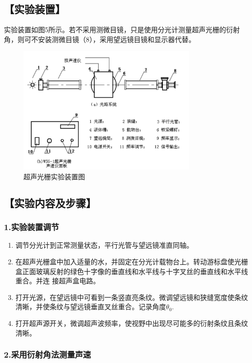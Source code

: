 \documentclass[12pt,a4paper,UTF8]{ctexart}
\begin{document}
\subsection*{【实验装置】}
实验装置如图5所示。若不采用测微目镜，只是使用分光计测量超声光栅的衍射角，则可不安装测微目镜（8），采用望远镜目镜和显示器代替。
\begin{figure}[htbp]
	\centering
	\includegraphics[width=0.8\textwidth]{img//6.jpg}
	\caption{超声光栅实验装置图}
\end{figure}


\subsection*{【实验内容及步骤】}

\subsubsection*{1.实验装置调节}
    \begin{enumerate}
		\item 调节分光计到正常测量状态，平行光管与望远镜准直同轴。
		\item 在超声光栅盒中加入适量的水，并固定在分光计载物台上。转动游标盘使光栅盒正面玻璃反射的绿色十字像的垂直线和水平线与十字叉丝的垂直线和水平线重合。并连
		接超声盒电路。
		\item 打开光源，在望远镜中可看到一条竖直亮条纹。微调望远镜和狭缝宽度使条纹清晰，并使条纹与望远镜垂直叉丝重合。记录角度$\theta_0$.
		\item 打开超声源开关，微调超声波频率，使视野中出现尽可能多的衍射条纹且条纹清晰。
	\end{enumerate}

\subsubsection*{2.采用衍射角法测量声速}
\end{document}

